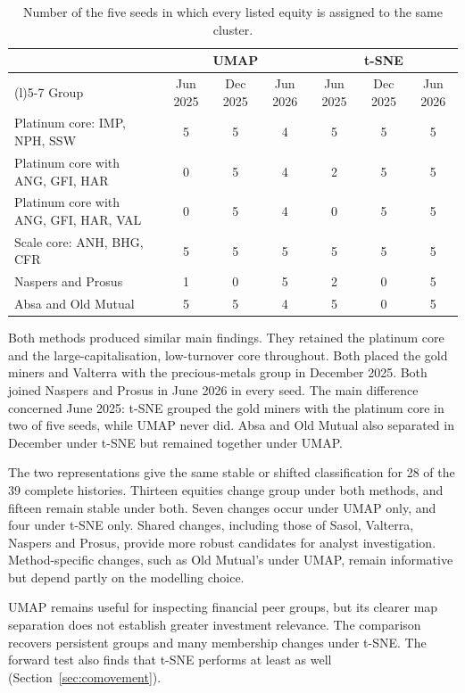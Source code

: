 \begin{table}[htbp]
\centering\caption{Number of the five seeds in which every listed equity is assigned to the same cluster.}\label{tab:method_groups}
\footnotesize
\begin{tabularx}{\linewidth}{@{}>{\raggedright\arraybackslash}X ccc ccc@{}}
\toprule
 & \multicolumn{3}{c}{UMAP} & \multicolumn{3}{c}{t-SNE} \\
\cmidrule(lr){2-4}\cmidrule(l){5-7}
Group & Jun 2025 & Dec 2025 & Jun 2026 & Jun 2025 & Dec 2025 & Jun 2026 \\
\midrule
Platinum core: IMP, NPH, SSW & 5 & 5 & 4 & 5 & 5 & 5 \\
Platinum core with ANG, GFI, HAR & 0 & 5 & 4 & 2 & 5 & 5 \\
Platinum core with ANG, GFI, HAR, VAL & 0 & 5 & 4 & 0 & 5 & 5 \\
Scale core: ANH, BHG, CFR & 5 & 5 & 5 & 5 & 5 & 5 \\
Naspers and Prosus & 1 & 0 & 5 & 2 & 0 & 5 \\
Absa and Old Mutual & 5 & 5 & 4 & 5 & 0 & 5 \\
\bottomrule
\end{tabularx}
\end{table}

Both methods produced similar main findings. They retained the platinum core and the large-capitalisation, low-turnover core throughout. Both placed the gold miners and Valterra with the precious-metals group in December 2025. Both joined Naspers and Prosus in June 2026 in every seed. The main difference concerned June 2025: t-SNE grouped the gold miners with the platinum core in two of five seeds, while UMAP never did. Absa and Old Mutual also separated in December under t-SNE but remained together under UMAP.

The two representations give the same stable or shifted classification for 28 of the 39 complete histories. Thirteen equities change group under both methods, and fifteen remain stable under both. Seven changes occur under UMAP only, and four under t-SNE only. Shared changes, including those of Sasol, Valterra, Naspers and Prosus, provide more robust candidates for analyst investigation. Method-specific changes, such as Old Mutual's under UMAP, remain informative but depend partly on the modelling choice.

UMAP remains useful for inspecting financial peer groups, but its clearer map separation does not establish greater investment relevance. The comparison recovers persistent groups and many membership changes under t-SNE. The forward test also finds that t-SNE performs at least as well (Section~\ref{sec:comovement}).

